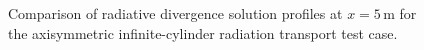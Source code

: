 \begin{figure}[htb]
\centering
{}
\caption{Comparison of radiative divergence solution profiles at $x=5$\,m for the axisymmetric infinite-cylinder radiation transport test case.}
\label{fig:axi_divq_profiles}
\end{figure}

